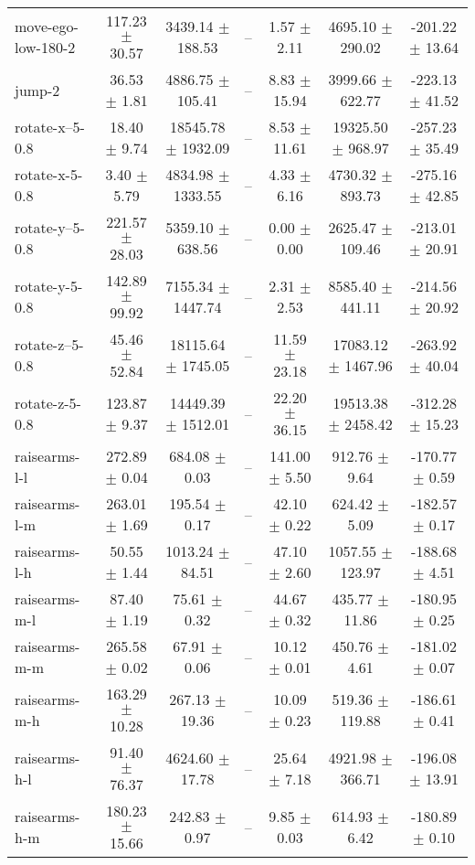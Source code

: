 \begin{tabular}{|lcccccc|}
move-ego-low-180-2 & 117.23 $\pm$ 30.57 & 3439.14 $\pm$ 188.53 & -- & 1.57 $\pm$ 2.11 & 4695.10 $\pm$ 290.02 & -201.22 $\pm$ 13.64 \\
jump-2 & 36.53 $\pm$ 1.81 & 4886.75 $\pm$ 105.41 & -- & 8.83 $\pm$ 15.94 & 3999.66 $\pm$ 622.77 & -223.13 $\pm$ 41.52 \\
rotate-x--5-0.8 & 18.40 $\pm$ 9.74 & 18545.78 $\pm$ 1932.09 & -- & 8.53 $\pm$ 11.61 & 19325.50 $\pm$ 968.97 & -257.23 $\pm$ 35.49 \\
rotate-x-5-0.8 & 3.40 $\pm$ 5.79 & 4834.98 $\pm$ 1333.55 & -- & 4.33 $\pm$ 6.16 & 4730.32 $\pm$ 893.73 & -275.16 $\pm$ 42.85 \\
rotate-y--5-0.8 & 221.57 $\pm$ 28.03 & 5359.10 $\pm$ 638.56 & -- & 0.00 $\pm$ 0.00 & 2625.47 $\pm$ 109.46 & -213.01 $\pm$ 20.91 \\
rotate-y-5-0.8 & 142.89 $\pm$ 99.92 & 7155.34 $\pm$ 1447.74 & -- & 2.31 $\pm$ 2.53 & 8585.40 $\pm$ 441.11 & -214.56 $\pm$ 20.92 \\
rotate-z--5-0.8 & 45.46 $\pm$ 52.84 & 18115.64 $\pm$ 1745.05 & -- & 11.59 $\pm$ 23.18 & 17083.12 $\pm$ 1467.96 & -263.92 $\pm$ 40.04 \\
rotate-z-5-0.8 & 123.87 $\pm$ 9.37 & 14449.39 $\pm$ 1512.01 & -- & 22.20 $\pm$ 36.15 & 19513.38 $\pm$ 2458.42 & -312.28 $\pm$ 15.23 \\
raisearms-l-l & 272.89 $\pm$ 0.04 & 684.08 $\pm$ 0.03 & -- & 141.00 $\pm$ 5.50 & 912.76 $\pm$ 9.64 & -170.77 $\pm$ 0.59 \\
raisearms-l-m & 263.01 $\pm$ 1.69 & 195.54 $\pm$ 0.17 & -- & 42.10 $\pm$ 0.22 & 624.42 $\pm$ 5.09 & -182.57 $\pm$ 0.17 \\
raisearms-l-h & 50.55 $\pm$ 1.44 & 1013.24 $\pm$ 84.51 & -- & 47.10 $\pm$ 2.60 & 1057.55 $\pm$ 123.97 & -188.68 $\pm$ 4.51 \\
raisearms-m-l & 87.40 $\pm$ 1.19 & 75.61 $\pm$ 0.32 & -- & 44.67 $\pm$ 0.32 & 435.77 $\pm$ 11.86 & -180.95 $\pm$ 0.25 \\
raisearms-m-m & 265.58 $\pm$ 0.02 & 67.91 $\pm$ 0.06 & -- & 10.12 $\pm$ 0.01 & 450.76 $\pm$ 4.61 & -181.02 $\pm$ 0.07 \\
raisearms-m-h & 163.29 $\pm$ 10.28 & 267.13 $\pm$ 19.36 & -- & 10.09 $\pm$ 0.23 & 519.36 $\pm$ 119.88 & -186.61 $\pm$ 0.41 \\
raisearms-h-l & 91.40 $\pm$ 76.37 & 4624.60 $\pm$ 17.78 & -- & 25.64 $\pm$ 7.18 & 4921.98 $\pm$ 366.71 & -196.08 $\pm$ 13.91 \\
raisearms-h-m & 180.23 $\pm$ 15.66 & 242.83 $\pm$ 0.97 & -- & 9.85 $\pm$ 0.03 & 614.93 $\pm$ 6.42 & -180.89 $\pm$ 0.10 \\

\end{tabular}
